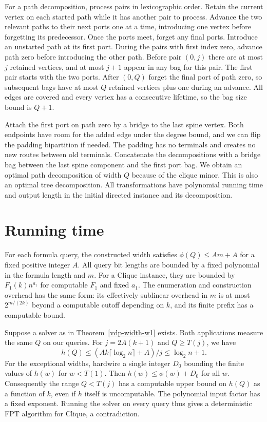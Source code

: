 \documentclass[11pt]{article}
\begin{document}
For a path decomposition, process pairs in lexicographic order. Retain
the current vertex on each started path while it has another pair
to process. Advance the two relevant paths to their next ports one at
a time, introducing one vertex before forgetting its predecessor.
Once the ports meet, forget any final ports. Introduce an unstarted path
at its first port. During the pairs with first index zero, advance path
zero before introducing the other path. Before pair \((0,j)\) there
are at most \(j\) retained vertices, and at most \(j+1\) appear in any
bag for this pair. The first pair starts with the two ports. After
\((0,Q)\) forget the final port of path zero, so subsequent bags have
at most \(Q\) retained vertices plus one during an advance. All edges are
covered and every vertex has a consecutive lifetime, so the bag size
bound is \(Q+1\).

Attach the first port on path zero by a bridge to the last spine vertex.
Both endpoints have room for the added edge under the degree bound, and
we can flip the padding bipartition if needed. The padding has no terminals
and creates no new routes between old terminals. Concatenate the
decompositions with a bridge bag between the last spine component and
the first port bag. We obtain an optimal path decomposition of width \(Q\)
because of the clique minor. This is also an optimal tree decomposition.
All transformations have polynomial running time and output length in
the initial directed instance and its decomposition.

\section{Running time}

For each formula query, the constructed width satisfies
\(\phi(Q)\le A m+A\) for a fixed positive integer \(A\). All query bit
lengths are bounded by a fixed polynomial in the formula length and \(m\).
For a Clique instance, they are bounded by \(F_1(k)n^{a_1}\) for computable
\(F_1\) and fixed \(a_1\). The enumeration and construction overhead has
the same form: its effectively sublinear overhead in \(m\) is at most
\(2^{m/(2k)}\) beyond a computable cutoff depending on \(k\), and its
finite prefix has a computable bound.

Suppose a solver as in Theorem~\ref{vdp-width-w1} exists. Both applications
measure the same \(Q\) on our queries. For \(j=2A(k+1)\) and
\(Q\ge T(j)\), we have
\[
 h(Q)\le (A k\lceil\log_2 n\rceil+A)/j
       \le \log_2 n+1.
\]
For the exceptional widths, hardwire a single integer \(D_0\) bounding
the finite values of \(h(w)\) for \(w<T(1)\). Then
\(h(w)\le \phi(w)+D_0\) for all \(w\). Consequently the range
\(Q<T(j)\) has a computable upper bound on \(h(Q)\) as a function of \(k\),
even if \(h\) itself is uncomputable. The polynomial input factor has
a fixed exponent. Running the solver on every query thus gives a
deterministic FPT algorithm for Clique, a contradiction.
\end{document}
